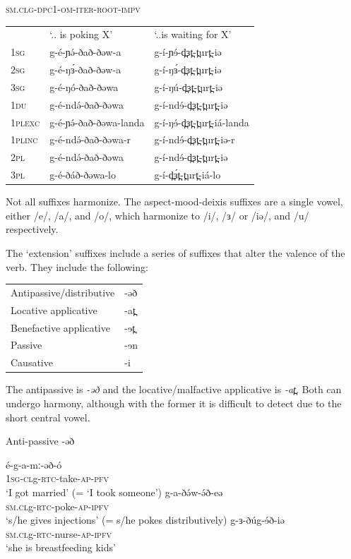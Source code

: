\ea \textsc{\textsc{sm.cl}g-dpc1-om-iter-root-impv}\\
\begin{tabular}[t]{lll}
&	‘.. is poking X’	&	‘..is waiting for X’\\
1\textsc{sg}	&	g-é-ɲə́-ðað-ðəw-a	&	g-í-ɲɘ́-d̪ɜt̪-t̪urt̪-iə\\
2\textsc{sg}	&	g-é-ŋɜ́-ðað-ðəw-a	&	g-í-ŋɜ́-d̪ɜt̪-t̪urt̪-iə\\
3\textsc{sg}	&	g-é-ŋó-ðað-ðəwa	&	g-í-ŋú-d̪ɜt̪-t̪urt̪-iə\\
1\textsc{du}	&	g-é-ndə́-ðað-ðəwa	&	g-í-ndɘ́-d̪ɜt̪-t̪urt̪-iə\\
1\textsc{plexc}	&	g-é-ɲə́-ðað-ðəwa-landa	&	g-í-ŋɘ́-d̪ɜt̪-t̪urt̪-iá-landa\\
1\textsc{plinc}	&	g-é-ndə́-ðað-ðəwa-r	&	g-í-ndɘ́-d̪ɜt̪-t̪urt̪-iə-r\\
2\textsc{pl}	&	g-é-ndə́-ðað-ðəwa	&	g-í-ndɘ́-d̪ɜt̪-t̪urt̪-iə\\
3\textsc{pl}	&	g-é-ðáð-ðəwa-lo	&	g-í-d̪ɜ́t̪-t̪urt̪-iá-lo\\
\end{tabular}
\z

Not all suffixes harmonize. The aspect-mood-deixis suffixes are a single vowel, either /e/, /a/, and /o/, which harmonize to /i/, /ɜ/ or /iə/, and /u/ respectively. 

The ‘extension’ suffixes include a series of suffixes that alter the valence of the verb. They include the following:

\ea
\begin{tabular}[t]{ll}
Antipassive/distributive		&	-əð\\
Locative applicative		&	-at̪\\
Benefactive applicative		&	-ɘt̪\\
Passive 					&	-ɘn\\
Causative					&	-i\\
\end{tabular}
\z

The antipassive is \textit{-əð} and the locative/malfactive applicative is \textit{-at̪}. Both can undergo harmony, although with the former it is difficult to detect due to the short central vowel.

\ea Anti-passive -əð
\begin{xlist}
	\ex \gll é-g-a-mː-əð-ó	\\
		1\textsc{sg}-\textsc{cl}g-\textsc{rtc}-take-\textsc{ap}-\textsc{pfv}  \\			
	\trans ‘I got married’ (= ‘I took someone’) 
	\ex \gll g-a-ðə́w-ə́ð-eə 		\\
		\textsc{sm.cl}g-\textsc{rtc}-poke-\textsc{ap}-\textsc{ipfv}  	\\
	\trans ‘s/he gives injections’ (= s/he pokes distributively)
	\ex \gll g-ɜ-ðúg-ɘ́ð-iə	\\
		\textsc{sm.cl}g-\textsc{rtc}-nurse-\textsc{ap}-\textsc{ipfv}  \\
	\trans ‘she is breastfeeding kids’
\end{xlist}
\z


